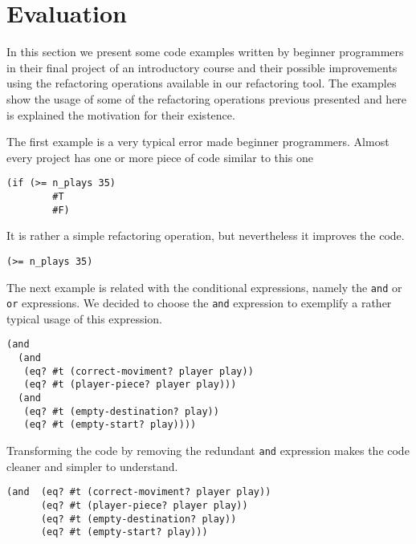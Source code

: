 

\section{Evaluation}
In this section we present some code examples written by beginner programmers
in their final project of an introductory course and their possible improvements
using the refactoring operations available in our refactoring tool.
The examples show the usage of some of the refactoring operations previous presented
and here is explained the motivation for their existence.

\lstset{style=racket}


The first example is a very typical error made beginner programmers.
Almost every project has one or more piece of code similar to this one
\begin{lstlisting}[basicstyle=\ttfamily]
  (if (>= n_plays 35)
        #T
        #F)
\end{lstlisting}
It is rather a simple refactoring operation, but nevertheless it improves the code.
\begin{lstlisting}[basicstyle=\ttfamily]
  (>= n_plays 35)
\end{lstlisting}

The next example is related with the conditional expressions, namely the {\tt and}
or {\tt or} expressions. We decided to choose the {\tt and} expression to exemplify a
rather typical usage of this expression.
\begin{lstlisting}[basicstyle=\ttfamily]
(and
  (and
   (eq? #t (correct-moviment? player play))
   (eq? #t (player-piece? player play)))
  (and
   (eq? #t (empty-destination? play))
   (eq? #t (empty-start? play))))
\end{lstlisting}


Transforming the code by removing the redundant {\tt and} expression makes the code
cleaner and simpler to understand.
\begin{lstlisting}[basicstyle=\ttfamily]
(and  (eq? #t (correct-moviment? player play))
      (eq? #t (player-piece? player play))
      (eq? #t (empty-destination? play))
      (eq? #t (empty-start? play)))
\end{lstlisting}

